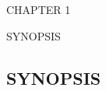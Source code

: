 \documentclass[12pt,a4paper]
{article}
\numberwithin{table}{section}
\begin{document}
			         
			         
\newpage
\pagestyle{fancy}
\fancyhead[RO]{}				%
\fancyhead[LO]{}				%
\renewcommand{\footrulewidth}{0.5pt}	     				%


\newpage

\begin{minipage}{15cm}


\vspace{4 in}
 \begin{center} 
\begin{Huge}
CHAPTER 1

\vspace{0.5 in}

SYNOPSIS
\end{Huge}

\end{center}
\end{minipage}
\newpage
\begin{center}
\section{SYNOPSIS}
\end{center}
\end{document}
